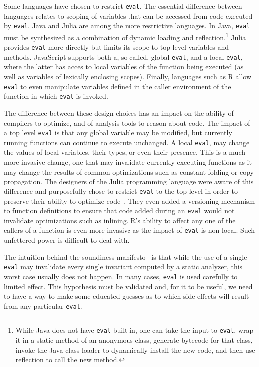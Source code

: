 \documentclass[a4paper,USenglish,cleveref, autoref, thm-restate]{lipics-v2019}
\newcommand{\eval}{\texttt{eval}\xspace}
\begin{document}
Some languages have chosen to restrict \eval. The essential difference
between languages relates to scoping of variables that can be accessed from
code executed by \eval.  Java and Julia are among the more restrictive
languages. In Java, \eval must be synthesized as a combination of dynamic
loading and reflection.\footnote{While Java does not have \eval built-in,
  one can take the input to \eval, wrap it in a static method of an
  anonymous class, generate bytecode for that class, invoke the Java class
  loader to dynamically install the new code, and then use reflection to
  call the new method.} Julia provides \eval more directly but limits its
scope to top level variables and methods. JavaScript supports both a,
so-called, global \eval, and a local \eval, where the latter has acces to
local variables of the function being executed (as well as variables of
lexically enclosing scopes). Finally, languages such as R allow \eval to
even manipulate variables defined in the caller environment of the function in
which \eval is invoked.

The difference between these design choices has an impact on the ability of
compilers to optimize, and of analysis tools to reason about code. The
impact of a top level \eval is that any global variable may be modified, but
currently running functions can continue to execute unchanged. A local
\eval, may change the values of local variables, their types, or even their
presence. This is a much more invasive change, one that may invalidate
currently executing functions as it may change the results of common
optimizations such as constant folding or copy propagation. The designers of
the Julia programming language were aware of this difference and
purposefully chose to restrict \eval to the top level in order to preserve
their ability to optimize code~\cite{oopsla18a}. They even added a
versioning mechanism to function definitions to ensure that code added
during an \eval would not invalidate optimizations such as inlining.  R's
ability to affect any one of the callers of a function is even more invasive
as the impact of \eval is non-local. Such unfettered power is difficult to
deal with.

The intuition behind the soundiness manifesto~\cite{soundy} is that while
the use of a single \eval may invalidate every single invariant computed by
a static analyzer, this worst case usually does not happen.  In many cases,
\eval is used carefully to limited effect. This hypothesis must be validated
and, for it to be useful, we need to have a way to make some educated
guesses as to which side-effects will result from any particular \eval.
\end{document}
